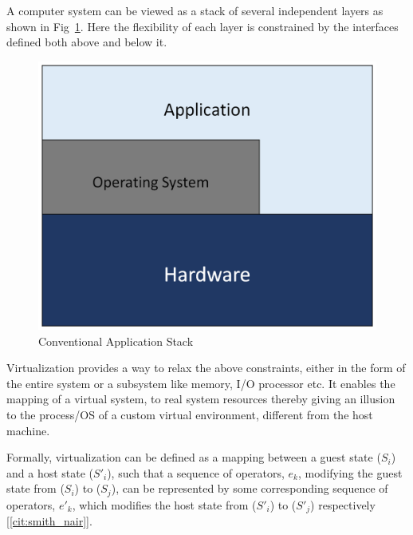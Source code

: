 A computer system can be viewed as a stack of several independent layers as shown in Fig~\ref{fig:appstack}. Here the flexibility of each layer is constrained by the interfaces defined both above and below it. 

\setlength{\belowcaptionskip}{-10pt}

\begin{figure}[H]
  \centering
  \includegraphics[scale=0.6]{figures/app_stack.png}
  \caption{Conventional Application Stack}
  \label{fig:appstack}
\end{figure}

Virtualization provides a way to relax the above constraints, either in the form of the entire system or a subsystem like memory, I/O processor etc. It enables the mapping of a virtual system, to real system resources thereby giving an illusion to the process/OS of a custom virtual environment, different from the host machine.

Formally, virtualization can be defined as a mapping between a guest state ($S_i$) and a host state ($S'_i$), such that a sequence of operators, $e_k$, modifying the guest state from ($S_i$) to ($S_j$), can be represented by some corresponding sequence of operators, $e'_k$, which modifies the host state from ($S'_i$) to ($S'_j$) respectively [\ref{cit:smith_nair}]. 

\setlength{\belowcaptionskip}{-10pt}

